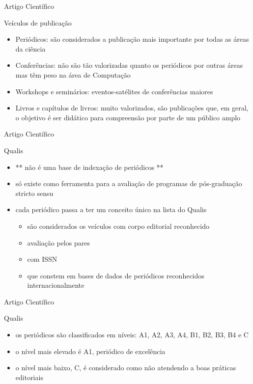 \begin{frame}{Artigo Científico}
    \begin{block}{Veículos de publicação}
        \begin{itemize}
            \item Periódicos: são considerados a publicação mais importante por todas as áreas da ciência
            \item Conferências: não são tão valorizadas quanto os periódicos por outras áreas mas têm peso na área de Computação
            \item Workshops e seminários: eventos-satélites de conferências maiores
            \item Livros e capítulos de livros: muito valorizados, são publicações que, em geral, o objetivo é ser didático para compreensão por parte de um público amplo
        \end{itemize}
    \end{block}
\end{frame}

\begin{frame}{Artigo Científico}
    \begin{block}{Qualis}
        \begin{itemize}
            \item ** não é uma base de indexação de periódicos **
            \item só existe como ferramenta para a avaliação de programas de pós-graduação stricto sensu
            \item cada periódico passa a ter um conceito único na lista do Qualis
            \begin{itemize}
                \item são considerados os veículos com corpo editorial reconhecido
                \item avaliação pelos pares
                \item com ISSN
                \item que constem em bases de dados de periódicos reconhecidos internacionalmente
            \end{itemize}
        \end{itemize}
    \end{block}
\end{frame}

\begin{frame}{Artigo Científico}
    \begin{block}{Qualis}
        \begin{itemize}
            \item os periódicos são classificados em níveis:  A1, A2, A3, A4, B1, B2, B3, B4 e C
            \item o nível mais elevado é A1, periódico de excelência
            \item o nível mais baixo, C, é considerado como não atendendo a boas práticas editoriais
        \end{itemize}
    \end{block}
\end{frame}

